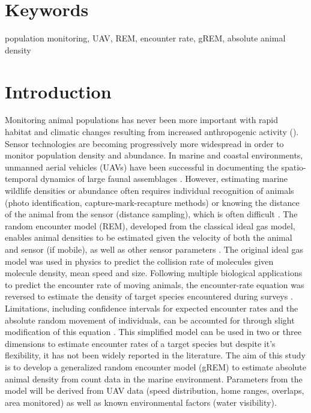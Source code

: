 \documentclass[11pt]{article}
\begin{document}
\section{Keywords}
population monitoring, UAV, REM, encounter rate, gREM, absolute animal density

\section{Introduction}
Monitoring animal populations has never been more important with rapid habitat and climatic changes resulting from increased anthropogenic activity (). Sensor technologies are becoming progressively more widespread in order to monitor population density and abundance. In marine and coastal environments, unmanned aerial vehicles (UAVs) have been successful in documenting the spatio-temporal dynamics of large faunal assemblages \cite{colefax2019reliability}. However, estimating marine wildlife densities or abundance often requires individual recognition of animals (photo identification, capture-mark-recapture methods) or knowing the distance of the animal from the sensor (distance sampling), which is often difficult \cite{Lucas}. The random encounter model (REM), developed from the classical ideal gas model, enables animal densities to be estimated given the velocity of both the animal and sensor (if mobile), as well as other sensor parameters \cite{rowcliffe}. The original ideal gas model was used in physics to predict the collision rate of molecules given molecule density, mean speed and size. Following multiple biological applications to predict the encounter rate of moving animals, the encounter-rate equation was reversed to estimate the density of target species encountered during surveys \cite{yapp1956theory}. Limitations, including confidence intervals for expected encounter rates and the absolute random movement of individuals, can be accounted for through slight modification of this equation \cite{hutchinson2007use}. This simplified model can be used in two or three dimensions to estimate encounter rates of a target species but despite it's flexibility, it has not been widely reported in the literature. The aim of this study is to develop a generalized random encounter model (gREM) to estimate absolute animal density from count data in the marine environment. Parameters from the model will be derived from UAV data (speed distribution, home ranges, overlaps, area monitored) as well as known environmental factors (water visibility).  
\end{document}
